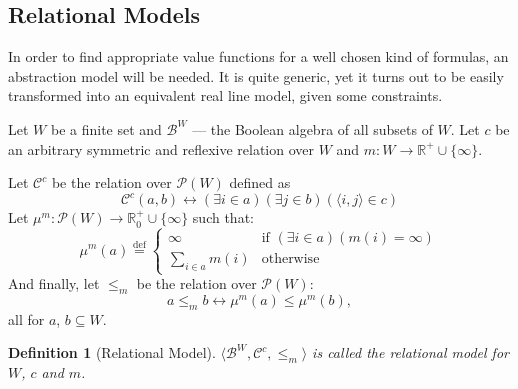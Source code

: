 \documentclass{article}
\newtheorem*{definition}{Definition}
\newcommand{\R}{\mathbb{R}}
\newcommand{\pwrset}{\mathcal{P}}
\newcommand{\B}{\mathcal{B}}
\newcommand{\eqdef}{\stackrel{\text{def}}{=}}
\begin{document}
\subsection{Relational Models}
In order to find appropriate value functions for a well chosen kind of formulas, an abstraction model will be needed. It is quite generic, yet it turns out to be easily transformed into an equivalent real line model, given some constraints.

Let $W$ be a finite set and $\B^W$ --- the Boolean algebra of all subsets of $W$. Let $c$ be an arbitrary symmetric and reflexive relation over $W$ and $m: W \rightarrow \R^+ \cup \{\infty\}$.

Let $\mathcal{C}^c$ be the relation over $\pwrset(W)$ defined as
\begin{equation*}
  \mathcal{C}^c(a, b) \longleftrightarrow (\exists i \in a)(\exists j \in b)(\langle i, j \rangle \in c)
\end{equation*}
Let $\mu^m: \pwrset(W) \rightarrow \R_0^+ \cup \{\infty\}$ such that:
\begin{equation*}
  \mu^m(a) \eqdef
  \begin{cases}
    \infty           & \text{if $(\exists i \in a)(m(i) = \infty)$} \\
    \sum_{i \in a}m(i) & \text{otherwise}
  \end{cases}
\end{equation*}
And finally, let $\leq_m$ be the relation over $\pwrset(W)$:
\begin{equation*}
  a \leq_m b \longleftrightarrow \mu^m(a) \leq \mu^m(b),
\end{equation*}
all for $a$, $b \subseteq W$.
\begin{definition}[Relational Model]
$\langle \B^W, \mathcal{C}^c, \leq_m \rangle$ is called the \emph{relational model for $W$, $c$ and $m$}.
\end{definition}
\end{document}
